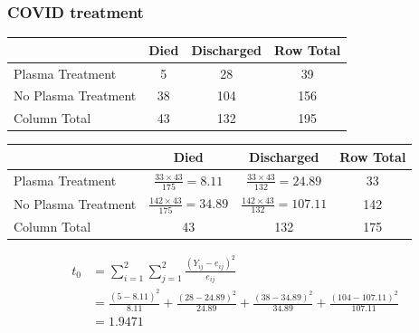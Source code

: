 \documentclass[a4paper]{article}
\begin{document}
\subsubsection{COVID treatment}
\begin{table}[H]
	\centering
	\begin{tabular}{@{}lccc@{}}
	\toprule
						& Died & Discharged & Row Total \\ \midrule
	Plasma Treatment    & 5    & 28         & 39  		\\
	No Plasma Treatment & 38   & 104        & 156 		\\ \midrule
	Column Total		& 43   & 132        & 195 		\\ \bottomrule
	\end{tabular}
\end{table}
\begin{table}[H]
	\centering
	\begin{tabular}{@{}lcc|c@{}}
	\toprule
						& Died 									  & Discharged 								& Row Total \\ \midrule
	Plasma Treatment    & \( \frac{33 \times 43}{175} = 8.11 \)   &\( \frac{33 \times 43}{132} = 24.89 \)   & 33  		\\
	No Plasma Treatment & \( \frac{142 \times 43}{175} = 34.89 \) &\( \frac{142 \times 43}{132} = 107.11 \) & 142 		\\ \midrule
	Column Total		& 43   									  & 132        								& 175 		\\ \bottomrule
	\end{tabular}
\end{table}
\begin{align*}
	t_0 &= \sum_{i=1}^{2}\sum_{j=1}^{2} \frac{(Y_{ij} - e_{ij})^2}{e_{ij}}\\
		&= \frac{(5-8.11)^2}{8.11} + \frac{(28-24.89)^2}{24.89} + \frac{(38-34.89)^2}{34.89} + \frac{(104-107.11)^2}{107.11}\\
		&= 1.9471
\end{align*}
\end{document}
